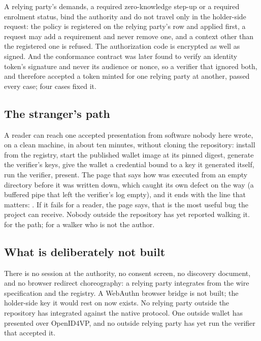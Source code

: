 A relying party's demands, a required zero-knowledge step-up or a required enrolment status, bind
the authority and do not travel only in the holder-side request: the policy is registered on the
relying party's row and applied first, a request may add a requirement and never remove one, and a
context other than the registered one is refused. The authorization code is encrypted as well as
signed. And the conformance
contract was later found to verify an identity token's signature and never its audience or nonce, so
a verifier that ignored both, and therefore accepted a token minted for one relying party at another,
passed every case; four cases fixed it. \sImpl

\subsection{The stranger's path}

A reader can reach one accepted presentation from software nobody here wrote, on a clean machine, in about ten
minutes, without cloning the repository: install  from the registry, start the
published wallet image at its pinned digest, generate the verifier's keys, give the wallet a
credential bound to a key it generated itself, run the verifier, present. The page that says how was
executed from an empty directory before it was written down, which caught its own defect on the way
(a buffered pipe that left the verifier's log empty), and it ends with the line that matters:
. If it
fails for a reader, the page says, that is the most useful bug the project can receive. Nobody
outside the repository has yet reported walking it. \sImplMark{} for the path; \sExt{} for a walker
who is not the author.

\subsection{What is deliberately not built}

There is no session at the authority, no consent screen, no discovery document, and no browser
redirect choreography: a relying party integrates from the wire specification and the registry. A
WebAuthn browser bridge is not built; the holder-side key it would rest on now exists. No relying
party outside the repository has integrated against the native protocol. One outside wallet has
presented over OpenID4VP, and no outside relying party has yet run the verifier that accepted it.
\sExt

